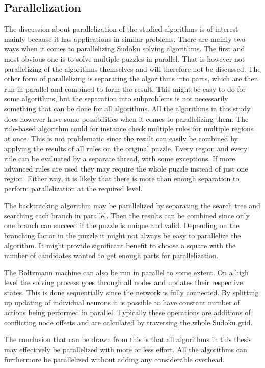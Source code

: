 \documentclass[a4paper,11pt]{kth-mag}
\begin{document}
\subsection{Parallelization}
The discussion about parallelization of the studied algorithms is of interest mainly because it has applications in similar problems.
There are mainly two ways when it comes to parallelizing Sudoku solving algorithms.
The first and most obvious one is to solve multiple puzzles in parallel.
That is however not parallelizing of the algorithms themselves and will therefore not be discussed.
The other form of parallelizing is separating the algorithms into parts, which are then run in parallel and combined to form the result.
This might be easy to do for some algorithms, but the separation into subproblems is not necessarily something that can be done for all algorithms.
All the algorithms in this study does however have some possibilities when it comes to parallelizing them.
The rule-based algorithm could for instance check multiple rules for multiple regions at once.
This is not problematic since the result can easily be combined by applying the results of all rules on the original puzzle.
Every region and every rule can be evaluated by a separate thread, with some exceptions.
If more advanced rules are used they may require the whole puzzle instead of just one region.
Either way, it is likely that there is more than enough separation to perform parallelization at the required level.

The backtracking algorithm may be parallelized by separating the search tree and searching each branch in parallel.
Then the results can be combined since only one branch can succeed if the puzzle is unique and valid.
Depending on the branching factor in the puzzle it might not always be easy to parallelize the algorithm.
It might provide significant benefit to choose a square with the number of candidates wanted to get enough parts for parallelization.

The Boltzmann machine can also be run in parallel to some extent.
On a high level the solving process goes through all nodes and updates their respective states.
This is done sequentially since the network is fully connected.
By splitting up updating of individual neurons it is possible to have constant number of actions being performed in parallel.
Typically these operations are additions of conflicting node offsets and are calculated by traversing the whole Sudoku grid.

The conclusion that can be drawn from this is that all algorithms in this thesis may effectively be parallelized with more or less effort.
All the algorithms can furthermore be parallelized without adding any considerable overhead.
\end{document}
